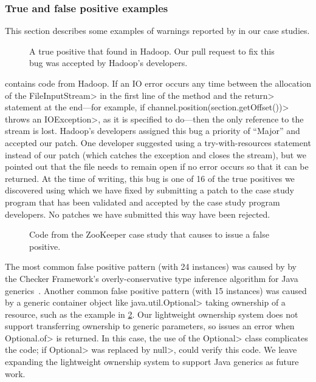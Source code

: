 \subsubsection{True and false positive examples}
\label{sec:examples}

This section describes some examples of warnings reported by \tool
in our case studies.

\begin{figure}
  
  \prefigcaption
  \caption{A true positive that \tool found in Hadoop. Our pull request
    to fix this bug was accepted by Hadoop's developers.}
  \label{fig:hadoop-bug}
\end{figure}

 contains code from Hadoop. If an IO error
occurs any time between the allocation of the \<FileInputStream>
in the first line of the method and the \<return> statement
at the end---for example, if \<channel.position(section.getOffset())>
throws an \<IOException>, as it is specified to do---then the
only reference to the stream is lost. Hadoop's developers
assigned this bug a priority of ``Major'' and accepted our
patch.
One developer suggested using a try-with-resources statement instead
of our patch (which catches the exception and closes the stream),
but we pointed out that
the file needs to remain open if no error occurs so that it can be
returned. At the time of writing, this bug is one of 16 of the true
positives we discovered using \tool which we have fixed by submitting
a patch to the case study program that has been validated and accepted
by the case study program developers. No patches we have submitted this way
have been rejected.

\begin{figure}
  
  \prefigcaption
  \caption{Code from the ZooKeeper case study that causes \tool
  to issue a false positive.}
  \label{fig:zookeeper-optional}
\end{figure}

The most common false
positive pattern (with 24 instances) was caused by
by the Checker Framework’s overly-conservative
type inference algorithm for Java generics~\cite{issue979}.
Another common false positive pattern (with 15 instances)
was caused by
a generic container object like \<java.util.Optional> taking ownership of a resource, such
as the example in \cref{fig:zookeeper-optional}. Our lightweight ownership
system does not support transferring ownership to generic parameters,
so \tool issues an error when \<Optional.of> is returned. In this case, the use
of the \<Optional> class complicates the code; if \<Optional> was replaced
by \<null>,
\Tool could verify this code. We leave expanding the lightweight ownership system to
support Java generics as future work.

